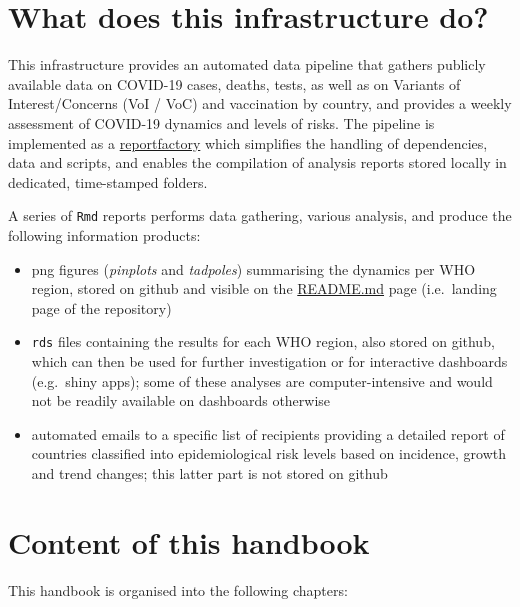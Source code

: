 \documentclass[]{book}
\begin{document}
\hypertarget{what-does-this-infrastructure-do}{%
\section{What does this infrastructure do?}\label{what-does-this-infrastructure-do}}

This infrastructure provides an automated data pipeline that gathers publicly
available data on COVID-19 cases, deaths, tests, as well as on Variants of
Interest/Concerns (VoI / VoC) and vaccination by country, and provides a weekly
assessment of COVID-19 dynamics and levels of risks. The pipeline is implemented
as a \href{https://www.reconverse.org/reportfactory/}{reportfactory} which simplifies
the handling of dependencies, data and scripts, and enables the compilation of
analysis reports stored locally in dedicated, time-stamped folders.

A series of \texttt{Rmd} reports performs data gathering, various analysis, and produce
the following information products:

\begin{itemize}
\item
  png figures (\emph{pinplots} and \emph{tadpoles}) summarising the dynamics per WHO
  region, stored on github and visible on the
  \href{https://github.com/whocov/trend_analysis_public}{README.md} page (i.e.~landing
  page of the repository)
\item
  \texttt{rds} files containing the results for each WHO region, also stored on github,
  which can then be used for further investigation or for interactive dashboards
  (e.g.~shiny apps); some of these analyses are computer-intensive and would not
  be readily available on dashboards otherwise
\item
  automated emails to a specific list of recipients providing a detailed report
  of countries classified into epidemiological risk levels based on incidence,
  growth and trend changes; this latter part is not stored on github
\end{itemize}

\hypertarget{content-of-this-handbook}{%
\section{Content of this handbook}\label{content-of-this-handbook}}

This handbook is organised into the following chapters:
\end{document}
